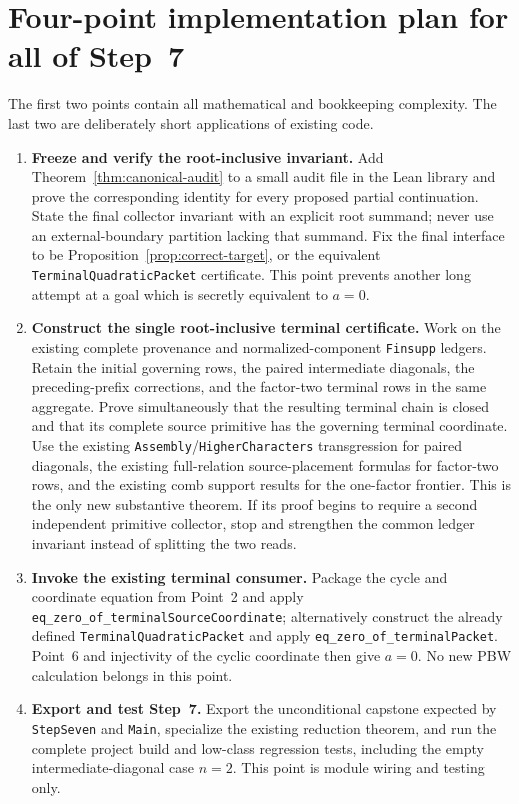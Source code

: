 \documentclass[11pt]{article}
\theoremstyle{definition}
\theoremstyle{remark}
\begin{document}
\section{Four-point implementation plan for all of Step~7}

The first two points contain all mathematical and bookkeeping complexity.
The last two are deliberately short applications of existing code.

\begin{enumerate}
\item \textbf{Freeze and verify the root-inclusive invariant.}
  Add Theorem~\ref{thm:canonical-audit} to a small audit file in the Lean
  library and prove the corresponding identity for every proposed partial
  continuation.  State the final collector invariant with an explicit root
  summand; never use an external-boundary partition lacking that summand.
  Fix the final interface to be Proposition~\ref{prop:correct-target}, or
  the equivalent \texttt{TerminalQuadraticPacket} certificate.  This point
  prevents another long attempt at a goal which is secretly equivalent to
  \(a=0\).

\item \textbf{Construct the single root-inclusive terminal certificate.}
  Work on the existing complete provenance and normalized-component
  \texttt{Finsupp} ledgers.  Retain the initial governing rows, the paired
  intermediate diagonals, the preceding-prefix corrections, and the
  factor-two terminal rows in the same aggregate.  Prove simultaneously
  that the resulting terminal chain is closed and that its complete source
  primitive has the governing terminal coordinate.  Use the existing
  \texttt{Assembly}/\texttt{HigherCharacters} transgression for paired
  diagonals, the existing full-relation source-placement formulas for
  factor-two rows, and the existing comb support results for the one-factor
  frontier.  This is the only new substantive theorem.  If its proof begins
  to require a second independent primitive collector, stop and strengthen
  the common ledger invariant instead of splitting the two reads.

\item \textbf{Invoke the existing terminal consumer.}
  Package the cycle and coordinate equation from Point~2 and apply
  \texttt{eq\_zero\_of\_terminalSourceCoordinate}; alternatively construct
  the already defined \texttt{TerminalQuadraticPacket} and apply
  \texttt{eq\_zero\_of\_terminalPacket}.  Point~6 and injectivity of the
  cyclic coordinate then give \(a=0\).  No new PBW calculation belongs in
  this point.

\item \textbf{Export and test Step~7.}
  Export the unconditional capstone expected by \texttt{StepSeven} and
  \texttt{Main}, specialize the existing reduction theorem, and run the
  complete project build and low-class regression tests, including the
  empty intermediate-diagonal case \(n=2\).  This point is module wiring and
  testing only.
\end{enumerate}
\end{document}

